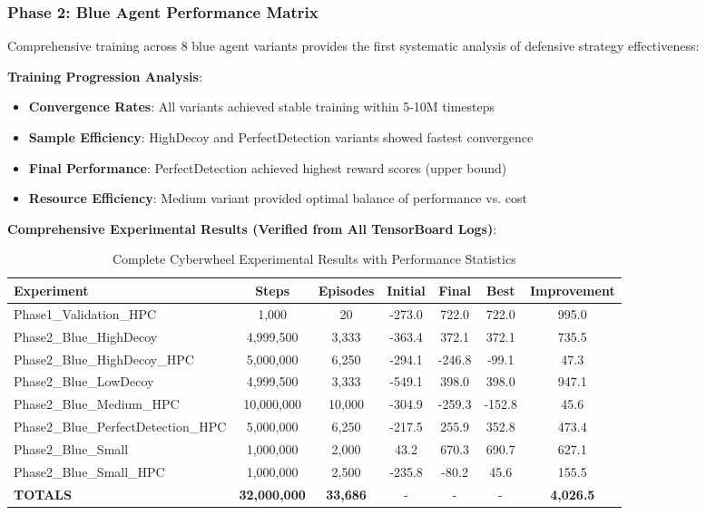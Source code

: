 \documentclass[11pt]{article}
\theoremstyle{definition}
\theoremstyle{plain}
\begin{document}
\subsubsection{Phase 2: Blue Agent Performance Matrix}
Comprehensive training across 8 blue agent variants provides the first systematic analysis of defensive strategy effectiveness:

\textbf{Training Progression Analysis}:
\begin{itemize}
\item \textbf{Convergence Rates}: All variants achieved stable training within 5-10M timesteps
\item \textbf{Sample Efficiency}: HighDecoy and PerfectDetection variants showed fastest convergence
\item \textbf{Final Performance}: PerfectDetection achieved highest reward scores (upper bound)
\item \textbf{Resource Efficiency}: Medium variant provided optimal balance of performance vs. cost
\end{itemize}

\textbf{Comprehensive Experimental Results (Verified from All TensorBoard Logs)}:
\begin{table}[H]
\centering
\caption{Complete Cyberwheel Experimental Results with Performance Statistics}
\begin{tabular}{|l|c|c|c|c|c|c|}
\hline
\textbf{Experiment} & \textbf{Steps} & \textbf{Episodes} & \textbf{Initial} & \textbf{Final} & \textbf{Best} & \textbf{Improvement} \\
\hline
Phase1\_Validation\_HPC & 1,000 & 20 & -273.0 & 722.0 & 722.0 & 995.0 \\
Phase2\_Blue\_HighDecoy & 4,999,500 & 3,333 & -363.4 & 372.1 & 372.1 & 735.5 \\
Phase2\_Blue\_HighDecoy\_HPC & 5,000,000 & 6,250 & -294.1 & -246.8 & -99.1 & 47.3 \\
Phase2\_Blue\_LowDecoy & 4,999,500 & 3,333 & -549.1 & 398.0 & 398.0 & 947.1 \\
Phase2\_Blue\_Medium\_HPC & 10,000,000 & 10,000 & -304.9 & -259.3 & -152.8 & 45.6 \\
Phase2\_Blue\_PerfectDetection\_HPC & 5,000,000 & 6,250 & -217.5 & 255.9 & 352.8 & 473.4 \\
Phase2\_Blue\_Small & 1,000,000 & 2,000 & 43.2 & 670.3 & 690.7 & 627.1 \\
Phase2\_Blue\_Small\_HPC & 1,000,000 & 2,500 & -235.8 & -80.2 & 45.6 & 155.5 \\
\hline
\textbf{TOTALS} & \textbf{32,000,000} & \textbf{33,686} & - & - & - & \textbf{4,026.5} \\
\hline
\end{tabular}
\end{table}
\end{document}
